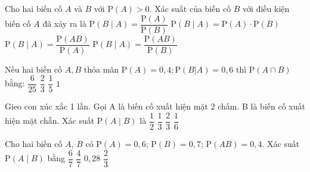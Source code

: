 

\begin{ex}%
	Cho hai  biến cố $A$ và $B$ với $\mathrm{P}(A)>0$. Xác suất của biến cố $B$ với điều kiện biến cố $A$ đã
	xảy  ra là
	\choice 
		{$\mathrm{P}(B\mid  A)=\dfrac{\mathrm{P}(A)}{\mathrm{P}(B)}$}
		{$\mathrm{P}(B\mid  A)=\mathrm{P}(A)\cdot \mathrm{P}(B)$}
		 {\True $\mathrm{P}(B\mid A)=\dfrac{\mathrm{P}(AB)}{\mathrm{P}(A)}$}
		 {$\mathrm{P}(B\mid A)=\dfrac{\mathrm{P}(AB)}{\mathrm{P}(B)}$}
\end{ex}

\begin{ex}%
	Nếu hai biến cố $A,B$ thỏa mãn $\mathrm{P}\left(A\right)=0{,}4;\mathrm{P}\left(B|A\right)=0{,}6$ thì $\mathrm{P}\left(A\cap B\right)$ bằng: 
	\choice 
		{\True  $\dfrac{6}{25}$}
		 {$\dfrac{2}{3}$}
		 {$\dfrac{1}{5}$}
		{$1$} 
\end{ex}

\begin{ex}%
	Gieo con xúc xắc 1 lần. Gọi A là biến cố xuất hiện mặt 2 chấm. B là biến cố xuất hiện mặt chẵn. Xác suất $\mathrm{P}\left(A\mid B\right)$  là
	\choice 
		 {$\dfrac{1}{2}$}
		{\True $\dfrac{1}{3}$} 
		 {$\dfrac{2}{3}$}
		{$\dfrac{1}{6}$} 
\end{ex}

\begin{ex}%
	Cho hai biến cố $A$, $B$ có $\mathrm{P}(A)=0{,}6$; $\mathrm{P}(B)=0{,}7$; $\mathrm{P}(AB)=0{,}4$. Xác suất  $\mathrm{P}(A\mid B)$ bằng
	 \choice
		 {$\dfrac{6}{7}$}
		 {\True $\dfrac{4}{7}$}
		{$0{,}28$} 
		{$\dfrac{2}{3}$} 
\end{ex}

